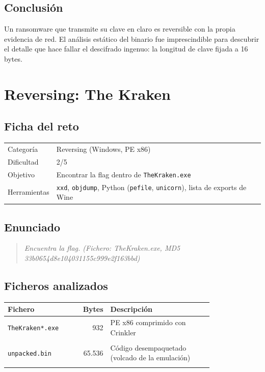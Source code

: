 \documentclass[11pt,a4paper]{article}
\begin{document}
\subsection{Conclusión}
Un ransomware que transmite su clave en claro es reversible con la propia evidencia de red. El análisis estático del
binario fue imprescindible para descubrir el detalle que hace fallar el descifrado ingenuo: la longitud de clave
fijada a 16 bytes.


\clearpage
\section{Reversing: The Kraken}

\subsection{Ficha del reto}
\begin{tabularx}{\linewidth}{@{}lX@{}}
\toprule
Categoría & Reversing (Windows, PE x86) \\
Dificultad & 2/5 \\
Objetivo & Encontrar la flag dentro de \texttt{TheKraken.exe} \\
Herramientas & \texttt{xxd}, \texttt{objdump}, Python (\texttt{pefile}, \texttt{unicorn}), lista de exports de Wine \\
\bottomrule
\end{tabularx}

\subsection{Enunciado}
\begin{quote}\itshape Encuentra la flag. (Fichero: TheKraken.exe, MD5 33b0654d8e104031155c999e2f163bbd)\end{quote}

\subsection{Ficheros analizados}
\begin{longtable}{@{}L{0.30\linewidth}r L{0.50\linewidth}@{}}
\toprule \textbf{Fichero} & \textbf{Bytes} & \textbf{Descripción} \\ \midrule \endhead
\texttt{TheKraken*.exe} & 932 & PE x86 comprimido con Crinkler \\ \nopagebreak
{} \\ \midrule
\texttt{unpacked.bin} & 65.536 & Código desempaquetado (volcado de la emulación) \\ \nopagebreak
{} \\ \midrule
\end{longtable}
\end{document}
